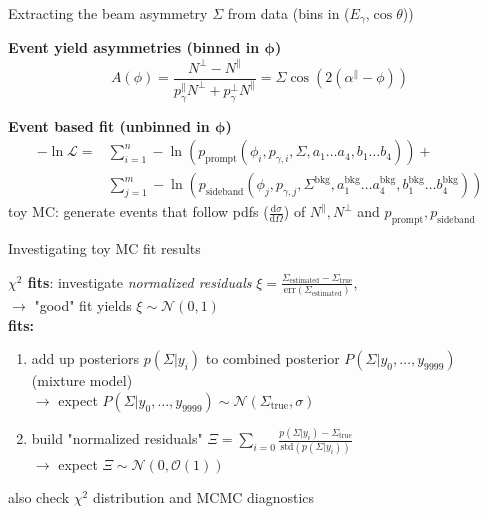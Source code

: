 \documentclass[11pt,aspectratio=169,dvipsnames]{beamer}
\newcommand{\thedate}{30th March 2022}
\begin{document}
	
	
	\begin{frame}{Extracting the beam asymmetry $\Sigma$ from data (bins in ($E_\gamma$,$\cos\theta$))}
		
			\textbf{Event yield asymmetries (binned in $\boldsymbol{\phi}$)}
			$$A(\phi)=\frac{N^\bot-N^\parallel}{p_{\gamma}^\parallel N^\bot+p_{\gamma}^\bot N^\parallel}=\Sigma\cos(2(\alpha^\parallel-\phi))$$


			\textbf{Event based fit (unbinned in $\boldsymbol{\phi}$)}
			\begin{align*}
				-\ln\mathcal{L}=&\sum_{i=1}^{n}-\ln(p_\text{prompt}(\phi_i,p_{\gamma,i},\Sigma,a_1\dots a_4,b_1\dots b_4))+\\
				&\sum_{j=1}^{m}-\ln\left(p_\text{sideband}(\phi_j,p_{\gamma,j},\Sigma^\text{bkg},a_1^\text{bkg}\dots a_4^\text{bkg},b_1^\text{bkg}\dots b_4^\text{bkg})\right)
			\end{align*}
		toy MC: generate events that follow pdfs ($\frac{\text{d}\sigma}{\text{d}\Omega}$) of $N^\parallel,N^\bot$ and $p_\text{prompt},p_\text{sideband}$
	\end{frame}
	\begin{frame}{Investigating toy MC fit results}

	\textbf{$\chi^2$ fits}: investigate \emph{normalized residuals} $\xi=\frac{\Sigma_\text{estimated}-\Sigma_\text{true}}{\text{err}(\Sigma_\text{estimated})}$, \\
	$\to$ "good" fit yields $\xi\sim\mathcal{N}(0,1)$\\
	\textbf{ fits:} 
	\begin{enumerate}[label=\alph*.]
		\item add up posteriors $p(\Sigma|y_i)$ to combined posterior $P(\Sigma|y_0,\dots,y_{9999})$ (mixture model)\\
		$\to$ expect $P(\Sigma|y_0,\dots,y_{9999})\sim\mathcal{N}(\Sigma_\text{true},\sigma)$
		\item build "normalized residuals" $\Xi=\sum_{i=0}\frac{p(\Sigma|y_i)-\Sigma_\text{true}}{\text{std}(p(\Sigma|y_i))}$\\
		$\to$ expect $\Xi\sim\mathcal{N}(0,\mathcal{O}(1))$
	\end{enumerate} 
also check $\chi^2$ distribution and MCMC diagnostics

		
	\end{frame}
\end{document}
